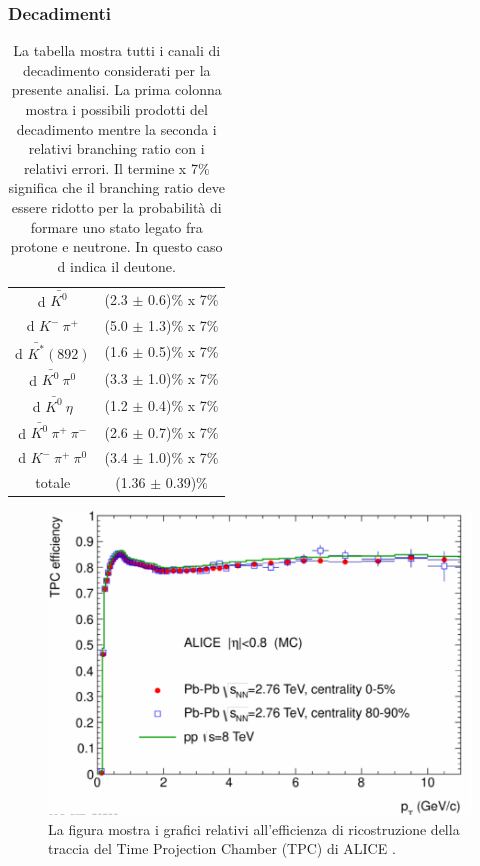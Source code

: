 \documentclass[11pt]{beamer}
\begin{document}
	\begin{frame}
		\frametitle{Decadimenti}
		\begin{table}[h]
			\centering
			\begin{tabular}{c|c}
				\hline
				\cellcolor{yellow} \text{Channel} & \cellcolor{yellow} \text{Branching ratio} \\
				\hline
				d $\bar{K^0}$ & (2.3 $\pm$ 0.6)\% x 7\% \\
				\hline
				d $K^- \ \pi^+$ &  (5.0 $\pm$ 1.3)\% x 7\% \\
				\hline
				d $\bar{K^*}(892)$ &  (1.6 $\pm$ 0.5)\% x 7\% \\
				\hline
				d $\bar{K^0} \ \pi^0$ &  (3.3 $\pm$ 1.0)\% x 7\% \\
				\hline
				d $\bar{K^0} \ \eta$ &  (1.2 $\pm$ 0.4)\% x 7\% \\
				\hline
				d $\bar{K^0} \ \pi^+ \ \pi^-$ &  (2.6 $\pm$ 0.7)\% x 7\% \\
				\hline
				d $K^- \ \pi^+ \ \pi^0$ &  (3.4 $\pm$ 1.0)\% x 7\% \\
				\hline
				totale & (1.36 $\pm$ 0.39)\% \\
				\hline
			\end{tabular}
			\caption{La tabella mostra tutti i canali di decadimento considerati per la presente analisi. La prima colonna mostra i possibili prodotti del decadimento mentre la seconda i relativi branching ratio con i relativi errori. Il termine x 7\% significa che il branching ratio deve essere ridotto per la probabilità di formare uno stato legato fra protone e neutrone. In questo caso d indica il deutone.}
			\label{tab:decay_channel}
		\end{table}
		
	\end{frame}
	
	\begin{frame}
		
		\begin{figure}		
			\centering
			\includegraphics[width=0.7\linewidth]{pictures/track_finding_efficiency_2.png}
			\caption{La figura mostra i grafici relativi all'efficienza di ricostruzione della traccia del Time Projection Chamber (TPC) di ALICE \cite{CERN-LHCC-2015-001}.}
		\end{figure}
	\end{frame}
	
\end{document}
